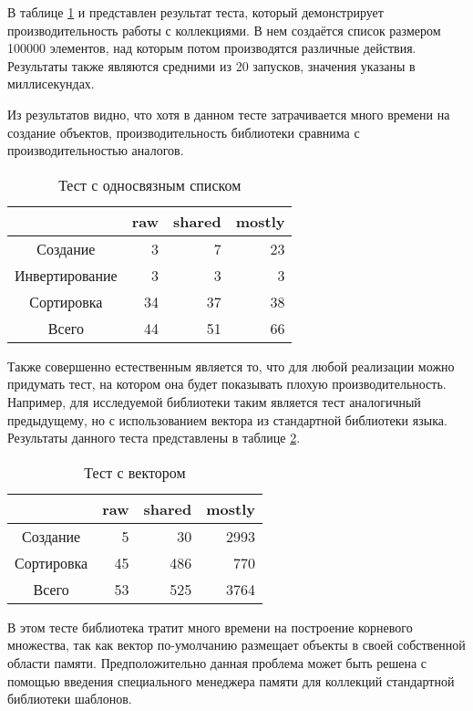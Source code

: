 В таблице \ref{table:list} и представлен результат теста, который демонстрирует производительность работы с коллекциями. В нем создаётся список размером 100000 элементов, над которым потом производятся различные действия. Результаты также являются средними из 20 запусков, значения указаны в миллисекундах. 

Из результатов видно, что хотя в данном тесте затрачивается много времени на создание объектов, производительность библиотеки сравнима с производительностью аналогов.

\begin{table}
\centering
\begin{tabular}{| c | r | r | r |} 
\hline
& raw & shared & mostly \\
\hline
Создание & 3 & 7 & 23 \\
\hline
Инвертирование & 3 & 3 & 3 \\
\hline
Сортировка & 34 & 37 & 38 \\
\hline
Всего & 44 & 51 & 66 \\
\hline
\end{tabular}
\caption{Тест с односвязным списком}
\label{table:list}
\end{table}

Также совершенно естественным является то, что для любой реализации можно придумать тест, на котором она будет показывать плохую производительность. Например, для исследуемой библиотеки таким является тест аналогичный предыдущему, но с использованием вектора из стандартной библиотеки языка. Результаты данного теста представлены в таблице \ref{table:vector}. 


\begin{table}
\centering
\begin{tabular}{| c | r | r | r |} 
\hline
& raw & shared & mostly \\ 
\hline
Создание & 5 & 30 & 2993 \\
\hline
Сортировка & 45 & 486 & 770 \\
\hline
Всего & 53 & 525 & 3764 \\
\hline
\end{tabular}
\caption{Тест с вектором}
\label{table:vector}
\end{table}

В этом тесте библиотека тратит много времени на построение корневого множества, так как вектор по-умолчанию размещает объекты в своей собственной области памяти. Предположительно данная проблема может быть решена с помощью введения специального менеджера памяти для коллекций стандартной библиотеки шаблонов.


